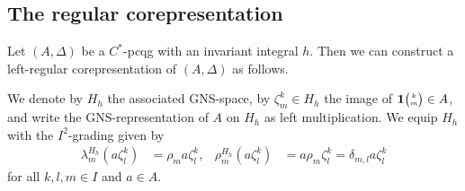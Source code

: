\documentclass[11pt]{article}
\newcommand{\Grt}[3]{#1{\tiny {\begin{pmatrix} #2\\#3\end{pmatrix}}}}
\newcommand{\UnitC}[2]{\Grt{\mathbf{1}}{#1}{#2}}
\newcommand{\Gr}[5]{\,\tensor*[^{#2}_{#4}]{#1}{^{#3}_{#5}}}%
\newcommand{\Grd}[3]{\Gr{#1}{}{}{#2}{#3}}
\newtheorem{Lem}[Theorem]{Lemma}
\theoremstyle{definition}
\newtheorem{Def}[Theorem]{Definition}
\numberwithin{equation}{section}
\begin{document}

  

\subsection{The regular corepresentation}
 Let $(A,\Delta)$ be a $C^{*}$-pcqg with an invariant integral $h$. 
 Then we can construct a left-regular corepresentation of $(A,\Delta)$ as follows.

 
 We denote by $H_{h}$ the associated GNS-space, by $\zeta^k_m \in H_{h}$ the image of $\UnitC{k}{m}
 \in A$, and write the GNS-representation of $A$ on $H_{h}$ as left multiplication.  We equip
 $H_{h}$ with the $I^{2}$-grading given by
 \begin{align*}
   \lambda^{H_{h}}_{m}  (a\zeta^{k}_{l}) &=  \rho_{m}a \zeta^{k}_{l}, &
   \rho^{H_{h}}_{m} (a\zeta^{k}_{l}) &= a\rho_{m} \zeta^{k}_{l} = \delta_{m,l} a\zeta^{k}_{l}
 \end{align*}
 for all $k,l,m\in I$ and $a\in A$.
\end{document}
